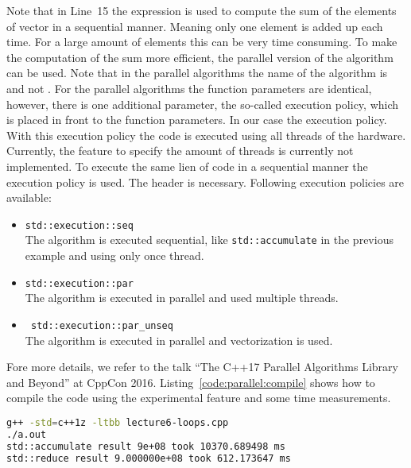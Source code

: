 Note that in Line~15 the expression  is used to compute the sum of the elements of vector  in a sequential manner. Meaning only one element is added up each time. For a large amount of elements this can be very time consuming. To make the computation of the sum more efficient, the parallel version of the algorithm can be used. Note that in the parallel algorithms the name of the algorithm is  and not . For the parallel algorithms the function parameters are identical, however, there is one additional parameter, the so-called execution policy, which is placed in front to the function parameters. In our case the  execution policy. With this execution policy the code is executed using all threads of the hardware. Currently, the feature to specify the amount of threads is currently not implemented. To execute the same lien of code in a sequential manner the execution policy  is used. The header  is necessary. Following execution policies are available:
\begin{itemize}
\item \lstinline|std::execution::seq| \\
The algorithm is executed sequential, like \lstinline|std::accumulate| in the previous example and using only once thread.
\item \lstinline|std::execution::par| \\
The algorithm is executed in parallel and used multiple threads.
\item \lstinline| std::execution::par_unseq| \\
The algorithm is executed in parallel and vectorization is used.
\end{itemize}
Fore more details, we refer to the talk ``The C++17 Parallel Algorithms Library and
Beyond'' at CppCon 2016. Listing~\ref{code:parallel:compile} shows how to compile the code using the experimental feature and some time measurements.





\begin{lstlisting}[language=bash,caption={Compilation of the parallel algorithm example.\label{code:parallel:compile}},float,floatplacement=tb]
g++ -std=c++1z -ltbb lecture6-loops.cpp 
./a.out
std::accumulate result 9e+08 took 10370.689498 ms
std::reduce result 9.000000e+08 took 612.173647 ms
\end{lstlisting}


\newpage
\theendnotes
